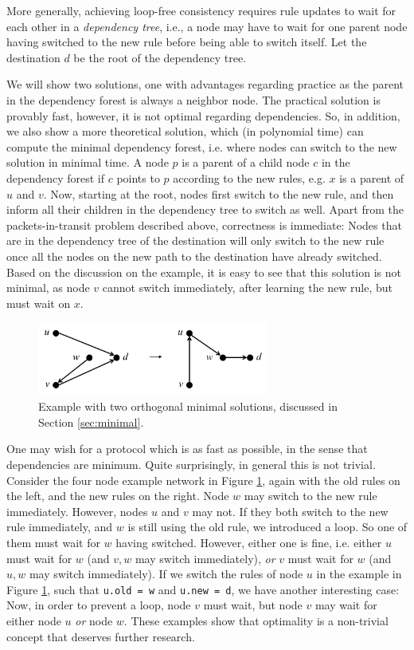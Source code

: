 More generally, achieving loop-free consistency requires rule updates to wait for each other in a \emph{dependency tree}, i.e., a node may have to wait for one parent node having switched to the new rule before being able to switch itself. Let the destination $d$ be the root of the dependency tree.

We will show two solutions, one with advantages regarding practice as the parent in the dependency forest is always a neighbor node. The practical solution is provably fast, however, it is not optimal regarding dependencies. So, in addition, we also show a more theoretical solution, which (in polynomial time) can compute the minimal dependency forest, i.e. where nodes can switch to the new solution in minimal time.
A node $p$ is a parent of a child node $c$ in the dependency forest if $c$ points to $p$ according to the new rules, e.g. $x$ is a parent of $u$ and $v$. Now, starting at the root, nodes first switch to the new rule, and then inform all their children in the dependency tree to switch as well. Apart from the packets-in-transit problem described above, correctness is immediate: Nodes that are in the dependency tree of the destination will only switch to the new rule once all the nodes on the new path to the destination have already switched. Based on the discussion on the example, it is easy to see that this solution is not minimal, as node $v$ cannot switch immediately, after learning the new rule, but must wait on $x$.

\begin{figure}[t!]
\includegraphics[width=3in]{figures/nominimum.png}
\caption{Example with two orthogonal minimal solutions, discussed in Section \ref{sec:minimal}.}
\label{fig:minimal}
\end{figure}

One may wish for a protocol which is as fast as possible, in the sense that dependencies are minimum. Quite
surprisingly, in general this is not trivial. Consider the four node example network in Figure \ref{fig:minimal}, again with the old rules on the left, and the new rules on the right. Node $w$ may switch to the new rule immediately. However, nodes $u$ and $v$ may not. If they both switch to the new rule immediately, and $w$ is still using the old rule, we introduced a loop. So one of them must wait for $w$ having switched. However, either one is fine, i.e. either $u$ must wait for $w$ (and $v,w$ may switch immediately), \emph{or} $v$ must wait for $w$ (and $u,w$ may switch immediately). If we switch the rules of node $u$ in the example in Figure \ref{fig:minimal}, such that \texttt{u.old = w} and \texttt{u.new = d}, we have another interesting case: Now, in order to prevent a loop, node $v$ must wait, but node $v$ may wait for either node $u$ \emph{or} node $w$. These examples show that optimality is a non-trivial concept that deserves further research.

